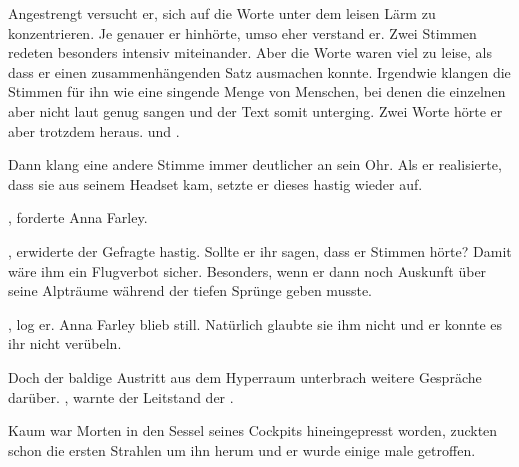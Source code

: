 \par

Angestrengt versucht er, sich auf die Worte unter dem leisen Lärm zu konzentrieren. Je genauer er hinhörte, umso eher verstand er. Zwei Stimmen redeten besonders intensiv miteinander. Aber die Worte waren viel zu leise, als dass er einen zusammenhängenden Satz ausmachen konnte. Irgendwie klangen die Stimmen für ihn wie eine singende Menge von Menschen, bei denen die einzelnen aber nicht laut genug sangen und der Text somit unterging. Zwei Worte hörte er aber trotzdem heraus.  und .

\par

Dann klang eine andere Stimme immer deutlicher an sein Ohr. Als er realisierte, dass sie aus seinem Headset kam, setzte er dieses hastig wieder auf.

\par

, forderte Anna Farley. 

\par

, erwiderte der Gefragte hastig.  Sollte er ihr sagen, dass er Stimmen hörte? Damit wäre ihm ein Flugverbot sicher. Besonders, wenn er dann noch Auskunft über seine Alpträume während der tiefen Sprünge geben musste.

\par

, log er. Anna Farley blieb still. Natürlich glaubte sie ihm nicht und er konnte es ihr nicht verübeln.

\par

Doch der baldige Austritt aus dem Hyperraum unterbrach weitere Gespräche darüber. , warnte der Leitstand der . 

\par

Kaum war Morten in den Sessel seines Cockpits hineingepresst worden, zuckten schon die ersten Strahlen um ihn herum und er wurde einige male getroffen.